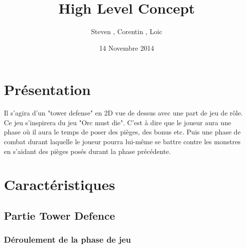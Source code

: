 \documentclass[12pt]{article}
\title{High Level Concept}
\author{Steven \bsc{Gerard}, Corentin \bsc{Raoult}, Loic \bsc{Tessier}}
\date {14 Novembre 2014}
\begin{document}
\maketitle{}

\section{Présentation}
Il s’agira d’un "tower defense" en 2D vue de dessus avec une part de jeu de rôle. Ce jeu
s'inspirera du jeu "Orc must die". C'est à dire que le joueur aura une phase où il aura le temps
de poser des pièges, des bonus etc. Puis une phase de combat durant laquelle le joueur pourra
lui-même se battre contre les monstres en s'aidant des pièges posés durant la phase précédente.

\section{Caractéristiques}
\subsection{Partie Tower Defence}
\subsubsection{Déroulement de la phase de jeu}

	
\end{document}
